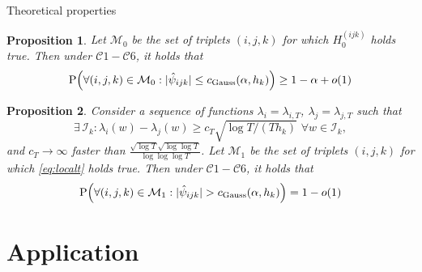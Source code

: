 \documentclass[10pt]{beamer}
\newcommand{\Prob}{\mathrm{P}}
\newtheorem{prop}{Proposition}
\begin{document}
\begin{frame}{Theoretical properties}
\begin{prop}\label{prop1}
Let $\mathcal{M}_0$ be the set of triplets $(i, j, k)$ for which $H_0^{(ijk)}$ holds true. Then under $\mathcal{C}1 - \mathcal{C}6$, it holds that 
\vspace{-2mm}
\begin{align*}
 \Prob\Big( \forall (i,j,k) \in \mathcal{M}_0: |\hat{\psi}_{ijk}| \le c_{\textnormal{Gauss}}(\alpha,h_k) \Big) \ge 1 - \alpha + o(1)
\end{align*}
\end{prop}\pause
\begin{prop}\label{prop2}
Consider a sequence of functions $\lambda_{i} = \lambda_{i,T}$, $\lambda_{j} = \lambda_{j, T}$ such that 
\begin{equation}\label{eq:localt}
\exists \, \mathcal{I}_{k}:  \lambda_{i}(w) - \lambda_{j}(w) \ge c_T \sqrt{\log T / (T h_{k})} \,\, \forall w \in \mathcal{I}_{k},
\end{equation} and $c_T \rightarrow \infty$ faster than $\frac{\sqrt{\log T}\sqrt{\log \log T}}{\log \log \log T}$.  Let $\mathcal{M}_1$ be the set of triplets $(i, j, k)$ for which \eqref{eq:localt} holds true. Then under $\mathcal{C}1 - \mathcal{C}6$, it holds that
\vspace{-2mm}
\begin{equation*}
\Prob\Big( \forall (i,j,k) \in \mathcal{M}_1: |\hat{\psi}_{ijk}| > c_{\textnormal{Gauss}}(\alpha,h_k) \Big) = 1 - o(1)
\end{equation*}
\end{prop}
\end{frame}

\section{Application}
\end{document}
